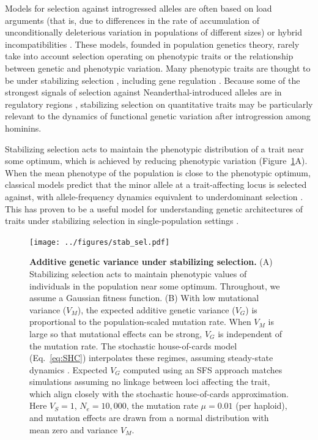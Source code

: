 \documentclass{article}
\newcommand{\moments}{\texttt{moments}\xspace}
\begin{document}
Models for selection against introgressed alleles are often based on load
arguments (that is, due to differences in the rate of accumulation of
unconditionally deleterious variation in populations of different sizes) or
hybrid incompatibilities \citep{muller1942isolating}. These models, founded in
population genetics theory, rarely take into account selection operating on
phenotypic traits or the relationship between genetic and phenotypic variation.
Many phenotypic traits are thought to be under stabilizing selection
\citep{sanjak2018evidence, sella2019thinking}, including gene regulation
\citep{gilad2006natural, hodgins2015gene, price2022detecting}. Because some of
the strongest signals of selection against Neanderthal-introduced alleles are
in regulatory regions \citep{sankararaman2014genomic}, stabilizing selection on
quantitative traits may be particularly relevant to the dynamics of functional
genetic variation after introgression among hominins.

Stabilizing selection acts to maintain the phenotypic distribution of a trait
near some optimum, which is achieved by reducing phenotypic variation
(Figure~\ref{fig:stab-sel}A). When the mean phenotype of the population is
close to the phenotypic optimum, classical models predict that the minor allele
at a trait-affecting locus is selected against, with allele-frequency dynamics
equivalent to underdominant selection \citep{robertson1956effect}. This has
proven to be a useful model for understanding genetic architectures of traits
under stabilizing selection in single-population settings
\citep[e.g.,][]{keightley1988quantitative, simons2018population,
hayward2022polygenic}.

\begin{figure}[tb!]
    \centering
    \texttt{[image: ../figures/stab\_sel.pdf]}
    \caption{
        \textbf{Additive genetic variance under stabilizing selection.}
        (A) Stabilizing selection acts to maintain phenotypic values of
        individuals in the population near some optimum. Throughout, we assume
        a Gaussian fitness function.
        (B) With low mutational variance ($V_M$), the expected additive
        genetic variance ($V_G$) is proportional to the
        population-scaled mutation rate. When $V_M$ is large so that
        mutational effects can be strong, $V_G$ is independent of the mutation
        rate. The stochastic house-of-cards model (Eq.~\ref{eq:SHC})
        interpolates these regimes, assuming steady-state dynamics
        \citep{burger1989much}. Expected $V_G$ computed using an SFS approach
        \citep[developed here using \moments,][]{jouganous2017inferring}
        matches simulations assuming no linkage between loci affecting the
        trait, which align closely with the stochastic house-of-cards
        approximation.
        Here $V_S=1$, $N_e=10{,}000$, the mutation rate
        $\mu=0.01$ (per haploid), and mutation effects are drawn from a normal
        distribution with mean zero and variance $V_M$.
    }
    \label{fig:stab-sel}
\end{figure}
\end{document}
